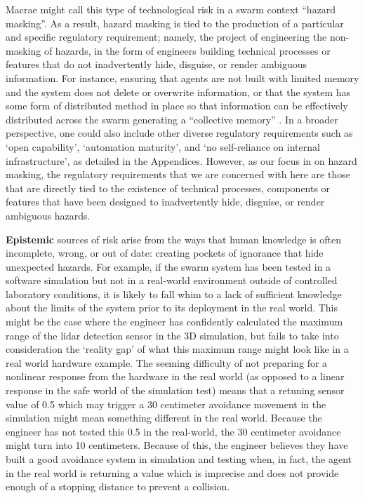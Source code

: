 \documentclass[lettersize,journal]{IEEEtran}
\begin{document}
Macrae \cite{macrae2021learning} might call this type of technological risk in a swarm context ``hazard masking”. As a result, hazard masking is tied to the production of a particular and specific regulatory requirement; namely, the project of engineering the non-masking of hazards, in the form of engineers building technical processes or features that do not inadvertently hide, disguise, or render ambiguous information. For instance, ensuring that agents are not built with limited memory and the system does not delete or overwrite information, or that the system has some form of distributed method in place so that information can be effectively distributed across the swarm generating a ``collective memory” \cite{wilson2022information}. In a broader perspective, one could also include other diverse regulatory requirements such as `open capability’, `automation maturity’, and `no self-reliance on internal infrastructure’, as detailed in the Appendices. However, as our focus in on hazard masking, the regulatory requirements that we are concerned with here are those that are directly tied to the existence of technical processes, components or features that have been designed to inadvertently hide, disguise, or render ambiguous hazards.

\textbf{Epistemic} sources of risk arise from the ways that human knowledge is often incomplete, wrong, or out of date: creating pockets of ignorance that hide unexpected hazards. For example, if the swarm system has been tested in a software simulation but not in a real-world environment outside of controlled laboratory conditions, it is likely to fall whim to a lack of sufficient knowledge about the limits of the system prior to its deployment in the real world. This might be the case where the engineer has confidently calculated the maximum range of the lidar detection sensor in the 3D simulation, but fails to take into consideration the `reality gap’ of what this maximum range might look like in a real world hardware example. The seeming difficulty of not preparing for a nonlinear response from the hardware in the real world (as opposed to a linear response in the safe world of the simulation test) means that a retuning sensor value of 0.5 which may trigger a 30 centimeter avoidance movement in the simulation might mean something different in the real world. Because the engineer has not tested this 0.5 in the real-world, the 30 centimeter avoidance might turn into 10 centimeters. Because of this, the engineer believes they have built a good avoidance system in simulation and testing when, in fact, the agent in the real world is returning a value which is imprecise and does not provide enough of a stopping distance to prevent a collision. 
\end{document}
